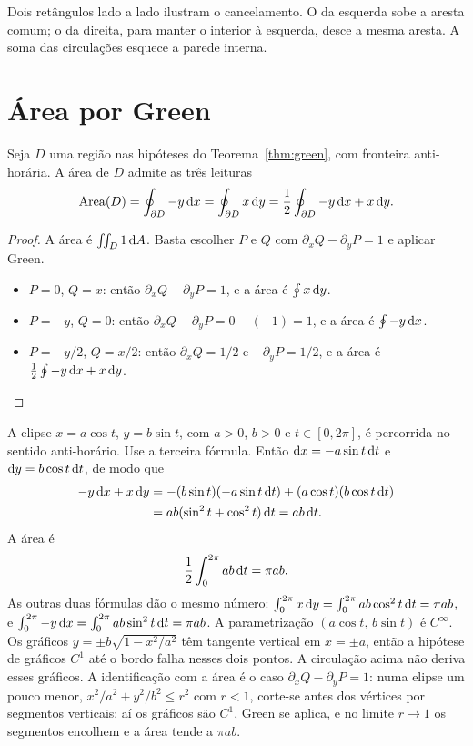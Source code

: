 \documentclass[11pt,a4paper]{article}
\begin{document}
Dois retângulos lado a lado ilustram o cancelamento. O da esquerda sobe a aresta comum; o da direita, para manter o interior à esquerda, desce a mesma aresta. A soma das circulações esquece a parede interna.

\section{Área por Green}

\begin{proposicao}
\label{prop:area}
Seja $D$ uma região nas hipóteses do Teorema~\ref{thm:green}, com fronteira anti-horária. A área de $D$ admite as três leituras
\[
\mathrm{Area}(D)
=\oint_{\partial D}-y\,\mathrm{d} x
=\oint_{\partial D}x\,\mathrm{d} y
=\frac12\oint_{\partial D}-y\,\mathrm{d} x+x\,\mathrm{d} y.
\]
\end{proposicao}

\begin{proof}
A área é $\iint_D 1\,\mathrm{d} A$. Basta escolher $P$ e $Q$ com $\partial_x Q-\partial_y P=1$ e aplicar Green.
\begin{itemize}
\item $P=0$, $Q=x$: então $\partial_x Q-\partial_y P=1$, e a área é $\oint x\,\mathrm{d} y$.
\item $P=-y$, $Q=0$: então $\partial_x Q-\partial_y P=0-(-1)=1$, e a área é $\oint -y\,\mathrm{d} x$.
\item $P=-y/2$, $Q=x/2$: então $\partial_x Q=1/2$ e $-\partial_y P=1/2$, e a área é $\frac12\oint -y\,\mathrm{d} x+x\,\mathrm{d} y$.
\end{itemize}
\end{proof}

\begin{exemplo}[Elipse]
A elipse $x=a\cos t$, $y=b\sin t$, com $a>0$, $b>0$ e $t\in[0,2\pi]$, é percorrida no sentido anti-horário. Use a terceira fórmula. Então $\mathrm{d} x=-a\sin t\,\mathrm{d} t$ e $\mathrm{d} y=b\cos t\,\mathrm{d} t$, de modo que
\begin{align*}
-y\,\mathrm{d} x+x\,\mathrm{d} y
&=-(b\sin t)(-a\sin t\,\mathrm{d} t)+(a\cos t)(b\cos t\,\mathrm{d} t)\\
&=ab(\sin^2 t+\cos^2 t)\,\mathrm{d} t
=ab\,\mathrm{d} t.
\end{align*}
A área é
\[
\frac12\int_0^{2\pi} ab\,\mathrm{d} t=\pi ab.
\]
As outras duas fórmulas dão o mesmo número: $\int_0^{2\pi} x\,\mathrm{d} y=\int_0^{2\pi} ab\cos^2 t\,\mathrm{d} t=\pi ab$, e $\int_0^{2\pi}-y\,\mathrm{d} x=\int_0^{2\pi} ab\sin^2 t\,\mathrm{d} t=\pi ab$. A parametrização $(a\cos t,\,b\sin t)$ é $C^\infty$. Os gráficos $y=\pm b\sqrt{1-x^2/a^2}$ têm tangente vertical em $x=\pm a$, então a hipótese de gráficos $C^1$ até o bordo falha nesses dois pontos. A circulação acima não deriva esses gráficos. A identificação com a área é o caso $\partial_x Q-\partial_y P=1$: numa elipse um pouco menor, $x^2/a^2+y^2/b^2\le r^2$ com $r<1$, corte-se antes dos vértices por segmentos verticais; aí os gráficos são $C^1$, Green se aplica, e no limite $r\to 1$ os segmentos encolhem e a área tende a $\pi ab$.
\end{exemplo}
\end{document}
